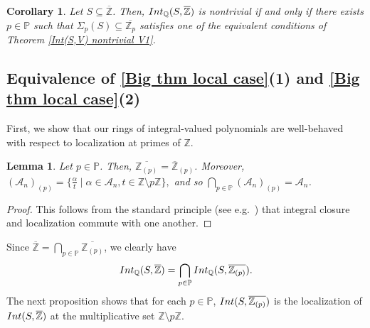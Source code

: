 \documentclass{article}
\newtheorem{Lem}[equation]{Lemma}
\newtheorem{Cor}[equation]{Corollary}
\theoremstyle{definition}\newtheorem{Def}[equation]{Definition}
\theoremstyle{definition}\newtheorem{Ques}[equation]{Question}
\theoremstyle{definition}\newtheorem{Conj}[equation]{Conjecture}
\theoremstyle{definition}\newtheorem{Not}[equation]{Notation}
\newcommand{\Q}{\mathbb{Q}}
\newcommand{\oZ}{\overline{\Z}}
\newcommand{\Z}{\mathbb{Z}}
\newcommand{\oZp}{\overline{\Z_p}}
\newcommand{\oQZp}{\overline{\Z_{(p)}}}
\newcommand{\Int}{\textnormal{Int}}
\newcommand{\IntQ}{\Int_{\Q}}
\newcommand{\PP}{\mathbb{P}}
\numberwithin{equation}{section}
\begin{document}
\begin{Cor}\label{Big cor local case}
Let $S \subseteq \oZ$. Then, $\IntQ(S, \oZ)$ is nontrivial if and only if there exists $p \in \PP$ such that $\Sigma_p(S) \subseteq \oZp$ satisfies one of the equivalent conditions of Theorem \ref{Int(S,V) nontrivial V1}.
\end{Cor}





\subsection*{Equivalence of \ref{Big thm local case}(1) and \ref{Big thm local case}(2)}

First, we show that our rings of integral-valued polynomials are well-behaved with respect to localization at primes of $\Z$.

\begin{Lem}\label{AnpAn V1}
Let $p\in\PP$. Then, $\oQZp=\oZ_{(p)}$. Moreover, $(\mathcal{A}_{n})_{(p)}=\{\tfrac{\alpha}{t}\mid\alpha\in\mathcal{A}_n,t\in\Z\setminus p\Z\},$
and so $\bigcap_{p\in\PP}(\mathcal{A}_{n})_{(p)}=\mathcal{A}_{n}$.
\end{Lem}
\begin{proof}
This follows from the standard principle (see e.g.\ \cite[Proposition 5.12]{AtiyahMacDonald}) that integral closure and localization commute with one another.
\end{proof}

Since $\oZ=\bigcap_{p\in\PP}\oQZp$, we clearly have
\begin{equation}\label{globallocal}
\IntQ(S,\oZ)=\bigcap_{p\in\PP}\IntQ(S,\oQZp). 
\end{equation}
The next proposition shows that for each $p\in\PP$, $\Int(S,\oQZp)$ is the localization of $\Int(S,\oZ)$ at the multiplicative set $\Z\setminus p\Z$.
\end{document}
